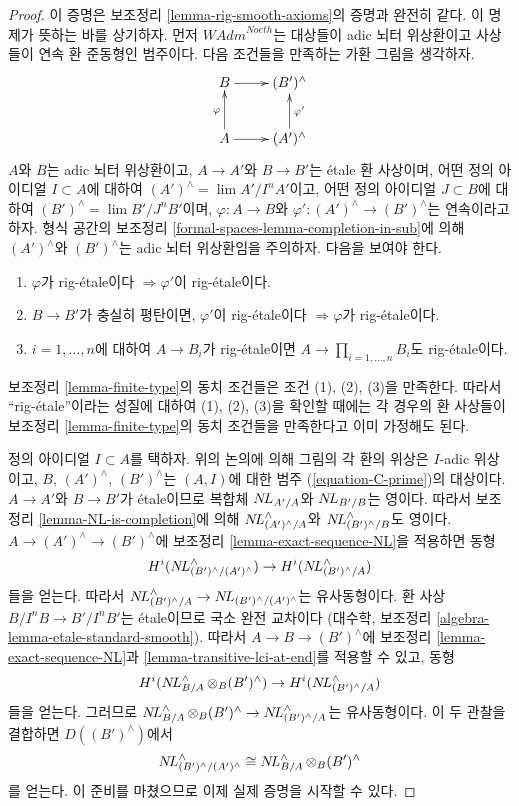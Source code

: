 \begin{proof}
이 증명은 보조정리 \ref{lemma-rig-smooth-axioms}의 증명과 완전히 같다.
이 명제가 뜻하는 바를 상기하자. 먼저 $\textit{WAdm}^{Noeth}$는
대상들이 adic 뇌터 위상환이고 사상들이 연속 환 준동형인 범주이다.
다음 조건들을 만족하는 가환 그림을 생각하자.
$$
\xymatrix{
B \ar[r] & (B')^\wedge \\
A \ar[r] \ar[u]^\varphi & (A')^\wedge \ar[u]_{\varphi'}
}
$$
$A$와 $B$는 adic 뇌터 위상환이고,
$A \to A'$와 $B \to B'$는 \'etale 환 사상이며,
어떤 정의 아이디얼 $I \subset A$에 대하여
$(A')^\wedge = \lim A'/I^nA'$이고,
어떤 정의 아이디얼 $J \subset B$에 대하여
$(B')^\wedge = \lim B'/J^nB'$이며,
$\varphi : A \to B$와 $\varphi' : (A')^\wedge \to (B')^\wedge$는 연속이라고 하자.
형식 공간의 보조정리 \ref{formal-spaces-lemma-completion-in-sub}에 의해
$(A')^\wedge$와 $(B')^\wedge$는 adic 뇌터 위상환임을 주의하자.
다음을 보여야 한다.
\begin{enumerate}
\item $\varphi$가 rig-\'etale이다 $\Rightarrow \varphi'$이 rig-\'etale이다.
\item $B \to B'$가 충실히 평탄이면, $\varphi'$이 rig-\'etale이다
$\Rightarrow \varphi$가 rig-\'etale이다.
\item $i = 1, \ldots, n$에 대하여 $A \to B_i$가 rig-\'etale이면
$A \to \prod_{i = 1, \ldots, n} B_i$도 rig-\'etale이다.
\end{enumerate}
보조정리 \ref{lemma-finite-type}의 동치 조건들은 조건 (1), (2), (3)을 만족한다.
따라서 ``rig-\'etale''이라는 성질에 대하여 (1), (2), (3)을 확인할 때에는
각 경우의 환 사상들이 보조정리 \ref{lemma-finite-type}의 동치 조건들을
만족한다고 이미 가정해도 된다.

\medskip\noindent
정의 아이디얼 $I \subset A$를 택하자. 위의 논의에 의해 그림의 각 환의 위상은
$I$-adic 위상이고, $B$, $(A')^\wedge$, $(B')^\wedge$는
$(A, I)$에 대한 범주 (\ref{equation-C-prime})의 대상이다.
$A \to A'$와 $B \to B'$가 \'etale이므로 복합체
$\mathop{N\!L}\nolimits_{A'/A}$와 $\mathop{N\!L}\nolimits_{B'/B}$는 영이다. 따라서 보조정리
\ref{lemma-NL-is-completion}에 의해
$\mathop{N\!L}\nolimits_{(A')^\wedge/A}^\wedge$와 $\mathop{N\!L}\nolimits_{(B')^\wedge/B}^\wedge$도 영이다.
$A \to (A')^\wedge \to (B')^\wedge$에 보조정리
\ref{lemma-exact-sequence-NL}을 적용하면 동형
$$
H^i(\mathop{N\!L}\nolimits_{(B')^\wedge/(A')^\wedge}^\wedge) \to H^i(\mathop{N\!L}\nolimits_{(B')^\wedge/A}^\wedge)
$$
들을 얻는다. 따라서
$\mathop{N\!L}\nolimits_{(B')^\wedge/A}^\wedge \to \mathop{N\!L}\nolimits_{(B')^\wedge/(A')^\wedge}$는
유사동형이다.
환 사상 $B/I^nB \to B'/I^nB'$는 \'etale이므로 국소 완전 교차이다
(대수학, 보조정리 \ref{algebra-lemma-etale-standard-smooth}).
따라서 $A \to B \to (B')^\wedge$에 보조정리
\ref{lemma-exact-sequence-NL}과 \ref{lemma-transitive-lci-at-end}를
적용할 수 있고, 동형
$$
H^i(\mathop{N\!L}\nolimits_{B/A}^\wedge \otimes_B (B')^\wedge) \to
H^i(\mathop{N\!L}\nolimits_{(B')^\wedge/A}^\wedge)
$$
들을 얻는다. 그러므로
$\mathop{N\!L}\nolimits_{B/A}^\wedge \otimes_B (B')^\wedge \to \mathop{N\!L}\nolimits_{(B')^\wedge/A}^\wedge$는
유사동형이다. 이 두 관찰을 결합하면 $D((B')^\wedge)$에서
$$
\mathop{N\!L}\nolimits_{(B')^\wedge/(A')^\wedge}^\wedge \cong
\mathop{N\!L}\nolimits_{B/A}^\wedge \otimes_B (B')^\wedge
$$
를 얻는다. 이 준비를 마쳤으므로 이제 실제 증명을 시작할 수 있다.


\end{proof}

